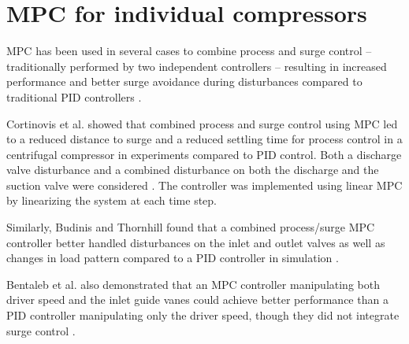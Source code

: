 
\section{MPC for individual compressors}
MPC has been used in several cases to combine process and surge control -- traditionally performed by two independent controllers -- resulting in increased performance and better surge avoidance during disturbances compared to traditional PID controllers \cite{Cortinovis2015,Budinis2015}.

Cortinovis et al. showed that combined process and surge control using MPC led to a reduced distance to surge and a reduced settling time for process control in a centrifugal compressor in experiments compared to PID control. 
Both a discharge valve disturbance and a combined disturbance on both the discharge and the suction valve were considered \cite{Cortinovis2015}. 
The controller was implemented using linear MPC by linearizing the system at each time step. 

Similarly, Budinis and Thornhill found that a combined process/surge MPC controller better handled disturbances on the inlet and outlet valves as well as changes in load pattern compared to a PID controller in simulation \cite{Budinis2015}.

Bentaleb et al. also demonstrated that an MPC controller manipulating both driver speed and the inlet guide vanes could achieve better performance than a PID controller manipulating only the driver speed, though they did not integrate surge control \cite{Bentaleb2014}.


